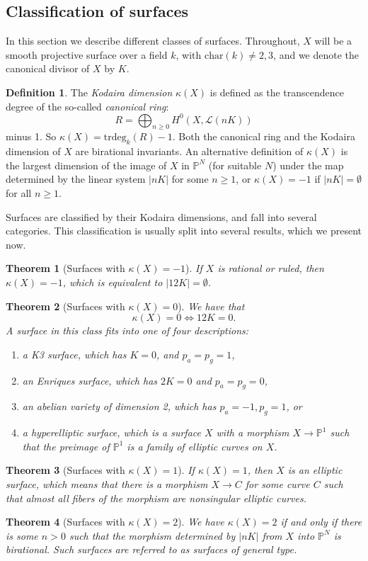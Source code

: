 \documentclass[12pt,twoside]{reedthesis}
\theoremstyle{plain}
\newtheorem{theorem}{Theorem}[chapter]
\theoremstyle{definition}
\newtheorem{definition}{Definition}[section]
\theoremstyle{remark}
\newcommand{\Proj}{\mathbb{P}}
\begin{document}
\subsection{Classification of surfaces}
In this section we describe different classes of surfaces. Throughout, $X$ will be a smooth projective surface over a field $k$, with $\text{char}(k)\neq2,3$, and we denote the canonical divisor of $X$ by $K$.
\begin{definition}
The \emph{Kodaira dimension} $\kappa(X)$ is defined as the transcendence degree of the so-called \emph{canonical ring}:
\[R=\bigoplus_{n\geq0}H^0(X,\mathcal{L}(nK))\]
minus 1. So $\kappa(X)=\text{trdeg}_k(R)-1$. Both the canonical ring and the Kodaira dimension of $X$ are birational invariants. An alternative definition of $\kappa(X)$ is the largest dimension of the image of $X$ in $\Proj^N$ (for suitable $N$) under the map determined by the linear system $|nK|$ for some $n\geq1$, or $\kappa(X)=-1$ if $|nK|=\emptyset$ for all $n\geq1$.
\end{definition}
Surfaces are classified by their Kodaira dimensions, and fall into several categories. This classification is usually split into several results, which we present now.
\begin{theorem}[Surfaces with $\kappa(X)=-1$]
If $X$ is \emph{rational} or \emph{ruled}, then $\kappa(X)=-1$, which is equivalent to $|12K|=\emptyset$.
\end{theorem}
\begin{theorem}[Surfaces with $\kappa(X)=0$]\label{classification}
We have that \[\kappa(X)=0\iff 12K=0.\] A surface in this class fits into one of four descriptions:
\begin{enumerate}
\item a \emph{K3 surface}, which has $K=0$, and $p_a=p_g=1$,
\item an \emph{Enriques surface}, which has $2K=0$ and $p_a=p_g=0$,
\item an \emph{abelian variety of dimension 2}, which has $p_a=-1,p_g=1$, or
\item a \emph{hyperelliptic surface}, which is a surface $X$ with a morphism $X\to\Proj^1$ such that the preimage of $\Proj^1$ is a family of elliptic curves on $X$.
\end{enumerate}
\end{theorem}
\begin{theorem}[Surfaces with $\kappa(X)=1$]
If $\kappa(X)=1$, then $X$ is an \emph{elliptic surface}, which means that there is a morphism $X\to C$ for some curve $C$ such that almost all fibers of the morphism are nonsingular elliptic curves.
\end{theorem}
\begin{theorem}[Surfaces with $\kappa(X)=2$]
We have $\kappa(X)=2$ if and only if there is some $n>0$ such that the morphism determined by $|nK|$ from $X$ into $\Proj^N$ is birational. Such surfaces are referred to as \emph{surfaces of general type}. 
\end{theorem}
\end{document}
